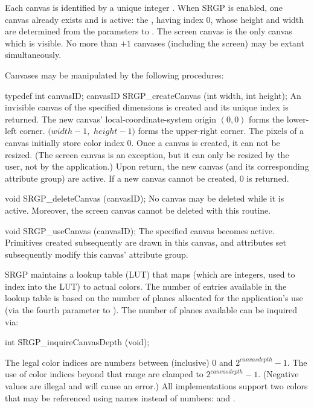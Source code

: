 \newpar
Each canvas is identified by a unique integer .  When SRGP
is enabled, one canvas already exists and is active: the ,
having index 0, whose height and width are determined from the parameters to
.  The screen canvas is the only canvas which is 
visible.  No more than
$+1$ canvases (including the screen) may be extant
simultaneously.



\newpar
Canvases may be manipulated by the following procedures:



\newsynopsis
typedef int canvasID;
canvasID SRGP_createCanvas (int width, int height);
\endsynopsis
An invisible canvas of the specified dimensions is created and its unique index
is returned.  The new canvas' local-coordinate-system origin $(0,0)$ forms the
lower-left corner.  $(width-1,$ $height-1)$ forms
the upper-right corner.  The pixels of a
canvas initially store color index 0.  Once a canvas is created, it
can not be resized.  (The screen canvas is an exception, but it can only be
resized by the user, not by the application.)  Upon return, the new
canvas (and its corresponding attribute group) are active.  If a new canvas
cannot be created, 0 is returned.


\nextsynopsis
void SRGP_deleteCanvas (canvasID);
\endsynopsis
No canvas may be deleted while it is active.  Moreover, the screen canvas
cannot be deleted with this routine.  


\nextsynopsis
void SRGP_useCanvas (canvasID);
\endsynopsis
The specified canvas becomes active.  Primitives created subsequently are drawn
in this canvas, and attributes set subsequently modify this canvas' attribute
group.




SRGP maintains a lookup table (LUT) that maps  (which are
integers, used to index into the LUT) to actual colors.  The number of entries
available in the lookup table is based on the number of planes allocated for
the application's use (via the fourth parameter to ).  The
number of planes available can be inquired via:

\begincode
int SRGP_inquireCanvasDepth (void);
\endcode

\newpar
The legal color indices are numbers between (inclusive) 0 and
$2^{canvasdepth}-1$.  The use of color indices beyond that range are clamped
to $2^{canvasdepth}-1$.  (Negative values are illegal and will cause
an error.)
All implementations support two colors that may be referenced using names
instead of numbers:  and .

